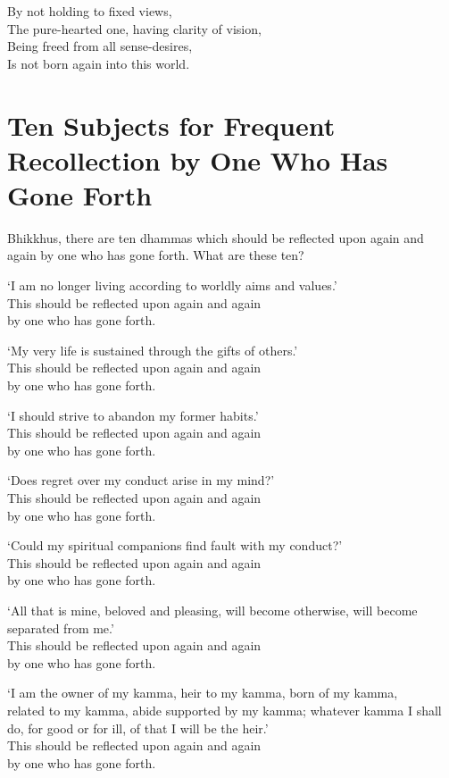 By not holding to fixed views,\\
The pure-hearted one, having clarity of vision,\\
Being freed from all sense-desires,\\
Is not born again into this world.


\section{Ten Subjects for Frequent Recollection by One Who Has Gone Forth}


Bhikkhus, there are ten dhammas which should be reflected upon again and again by one who has gone forth. What are these ten?

`I am no longer living according to worldly aims and values.'\\
This should be reflected upon again and again\\
by one who has gone forth.

`My very life is sustained through the gifts of others.'\\
This should be reflected upon again and again\\
by one who has gone forth.

`I should strive to abandon my former habits.'\\
This should be reflected upon again and again\\
by one who has gone forth.

`Does regret over my conduct arise in my mind?'\\
This should be reflected upon again and again\\
by one who has gone forth.

`Could my spiritual companions find fault with my conduct?'\\
This should be reflected upon again and again\\
by one who has gone forth.

`All that is mine, beloved and pleasing, will become otherwise, will become separated from me.'\\
This should be reflected upon again and again\\
by one who has gone forth.

`I am the owner of my kamma, heir to my kamma, born of my kamma,\\
related to my kamma, abide supported by my kamma; whatever kamma I shall do, for good or for ill, of that I will be the heir.'\\
This should be reflected upon again and again\\
by one who has gone forth.

